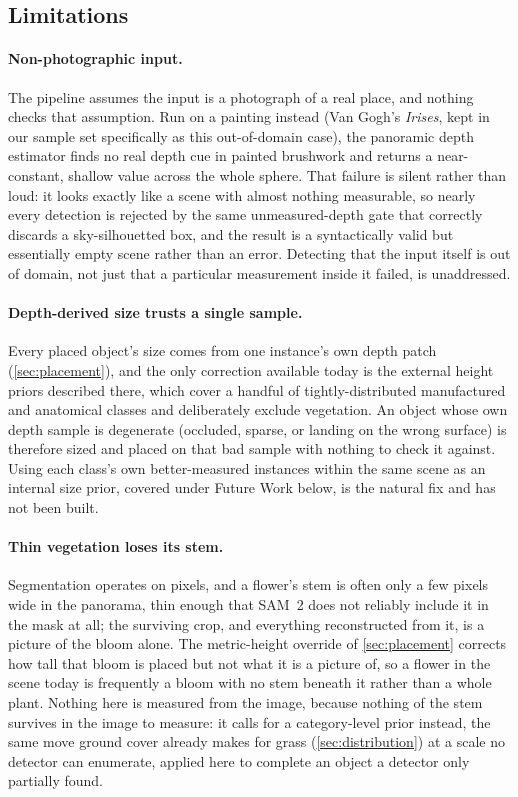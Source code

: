 \subsection{Limitations}
\label{sec:limitations}

\paragraph{Non-photographic input.} The pipeline assumes the input is a photograph
of a real place, and nothing checks that assumption. Run on a painting instead
(Van Gogh's \emph{Irises}, kept in our sample set specifically as this
out-of-domain case), the panoramic depth estimator finds no real depth cue in
painted brushwork and returns a near-constant, shallow value across the whole
sphere. That failure is silent rather than loud: it looks exactly like a scene
with almost nothing measurable, so nearly every detection is rejected by the same
unmeasured-depth gate that correctly discards a sky-silhouetted box, and the
result is a syntactically valid but essentially empty scene rather than an error.
Detecting that the input itself is out of domain, not just that a particular
measurement inside it failed, is unaddressed.

\paragraph{Depth-derived size trusts a single sample.} Every placed object's size
comes from one instance's own depth patch (\cref{sec:placement}), and the only
correction available today is the external height priors described there, which
cover a handful of tightly-distributed manufactured and anatomical classes and
deliberately exclude vegetation. An object whose own depth sample is degenerate
(occluded, sparse, or landing on the wrong surface) is therefore sized and placed
on that bad sample with nothing to check it against. Using each class's own
better-measured instances within the same scene as an internal size prior,
covered under Future Work below, is the natural fix and has not been built.

\paragraph{Thin vegetation loses its stem.} Segmentation operates on pixels, and a
flower's stem is often only a few pixels wide in the panorama, thin enough that
SAM~2 does not reliably include it in the mask at all; the surviving crop, and
everything reconstructed from it, is a picture of the bloom alone. The
metric-height override of \cref{sec:placement} corrects how tall that bloom is
placed but not what it is a picture of, so a flower in the scene today is
frequently a bloom with no stem beneath it rather than a whole plant. Nothing here
is measured from the image, because nothing of the stem survives in the image to
measure: it calls for a category-level prior instead, the same move ground cover
already makes for grass (\cref{sec:distribution}) at a scale no detector can
enumerate, applied here to complete an object a detector only partially found.


